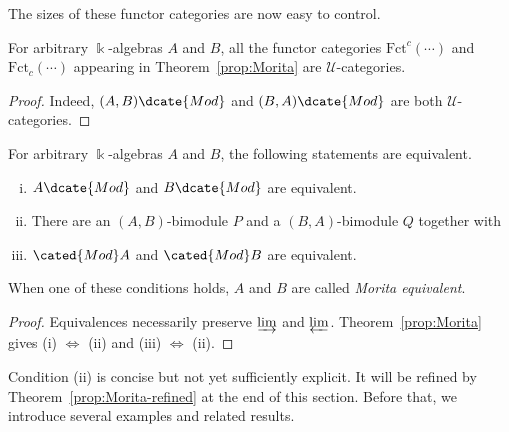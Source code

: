 The sizes of these functor categories are now easy to control.

\begin{corollary}
	For arbitrary $\Bbbk$-algebras $A$ and $B$, all the functor categories
	$\mathrm{Fct}^c(\cdots)$ and $\mathrm{Fct}_c(\cdots)$ appearing in
	Theorem~\ref{prop:Morita} are $\mathcal{U}$-categories.
\end{corollary}
\begin{proof}
	Indeed, $(A,B)\dcate{Mod}$ and $(B,A)\dcate{Mod}$ are both
	$\mathcal{U}$-categories.
\end{proof}

\begin{definition-proposition}\label{def:Morita-equiv}
	For arbitrary $\Bbbk$-algebras $A$ and $B$, the following statements are
	equivalent.
	\begin{enumerate}[(i)]
		\item $A\dcate{Mod}$ and $B\dcate{Mod}$ are equivalent.
		\item There are an $(A,B)$-bimodule $P$ and a $(B,A)$-bimodule $Q$
		together with
		\item $\cated{Mod}A$ and $\cated{Mod}B$ are equivalent.
	\end{enumerate}
	When one of these conditions holds, $A$ and $B$ are called
	\emph{Morita equivalent}.
\end{definition-proposition}
\begin{proof}
	Equivalences necessarily preserve $\varinjlim$ and $\varprojlim$.
	Theorem~\ref{prop:Morita} gives (i) $\iff$ (ii) and
	(iii) $\iff$ (ii).
\end{proof}

Condition (ii) is concise but not yet sufficiently explicit. It will be
refined by Theorem~\ref{prop:Morita-refined} at the end of this section.
Before that, we introduce several examples and related results.

